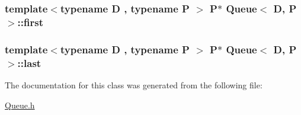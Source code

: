 \subsubsection[{\texorpdfstring{first}{first}}]{\setlength{\rightskip}{0pt plus 5cm}template$<$typename D , typename P $>$ P$\ast$ {\bf Queue}$<$ D, P $>$\+::first}\hypertarget{classQueue_a1d8e79c486d52a6e8b329bf0f337fe06}{}\label{classQueue_a1d8e79c486d52a6e8b329bf0f337fe06}
\subsubsection[{\texorpdfstring{last}{last}}]{\setlength{\rightskip}{0pt plus 5cm}template$<$typename D , typename P $>$ P$\ast$ {\bf Queue}$<$ D, P $>$\+::last}\hypertarget{classQueue_a466d5b8f1ec5d70fde748ac1b5c989c2}{}\label{classQueue_a466d5b8f1ec5d70fde748ac1b5c989c2}


The documentation for this class was generated from the following file\+:\begin{DoxyCompactItemize}
\item 
\hyperlink{Queue_8h}{Queue.\+h}\end{DoxyCompactItemize}
